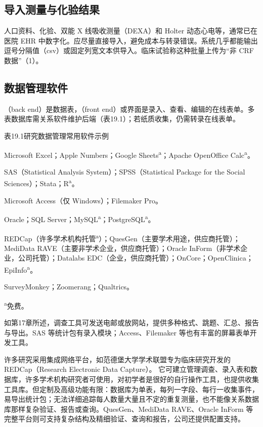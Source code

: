 \subsection{导入测量与化验结果}
人口资料、化验、双能 X 线吸收测量（DEXA）和 Holter 动态心电等，通常已在医院 EHR 中数字化。应尽量直接导入，避免成本与转录错误。系统几乎都能输出逗号分隔值（csv）或固定列宽文本供导入。临床试验称这种批量上传为“非 CRF 数据”（1）。

\subsection{数据管理软件}
（back end）是数据表，（front end）或界面是录入、查看、编辑的在线表单。多表数据库需关系软件维护后端（表19.1）；若纸质收集，仍需转录在线表单。
\begin{bookbox}{表19.1\quad 研究数据管理常用软件示例}
\begin{description}[leftmargin=1em,style=nextline]
\item[电子表格]Microsoft Excel；Apple Numbers；Google Sheets\textsuperscript{a}；Apache OpenOffice Calc\textsuperscript{a}。
\item[统计分析]SAS（Statistical Analysis System）；SPSS（Statistical Package for the Social Sciences）；Stata；R\textsuperscript{a}。
\item[集成桌面数据库]Microsoft Access（仅 Windows）；Filemaker Pro。
\item[关系数据库]Oracle；SQL Server；MySQL\textsuperscript{a}；PostgreSQL\textsuperscript{a}。
\item[集成网络研究数据管理平台]REDCap（许多学术机构托管\textsuperscript{a}）；QuesGen（主要学术用途，供应商托管）；MediData RAVE（主要非学术企业，供应商托管）；Oracle InForm（非学术企业，公司托管）；Datalabs EDC（企业，供应商托管）；OnCore；OpenClinica；EpiInfo\textsuperscript{a}。
\item[在线调查]SurveyMonkey；Zoomerang；Qualtrics。
\end{description}
\small\textsuperscript{a}免费。
\end{bookbox}
如第17章所述，调查工具可发送电邮或放网站，提供多种格式、跳题、汇总、报告与导出。SAS 等统计包有录入模块；Access、Filemaker 等也有丰富的屏幕表单开发工具。

许多研究采用集成网络平台，如范德堡大学学术联盟专为临床研究开发的 REDCap（Research Electronic Data Capture）。
它可建立管理调查、录入表和数据库，许多学术机构研究者可使用，对初学者是很好的自行操作工具，也提供收集工具库。但定制及高级功能有限：数据库为单表，每列一字段、每行一收集事件，易导出统计包；无法详细追踪每人数量大量且不定的重复测量，也不能像关系数据库那样复杂验证、报告或查询。QuesGen、MediData RAVE、Oracle InForm 等完整平台则可支持复杂结构及精细验证、查询和报告，公司还提供配置支持。

